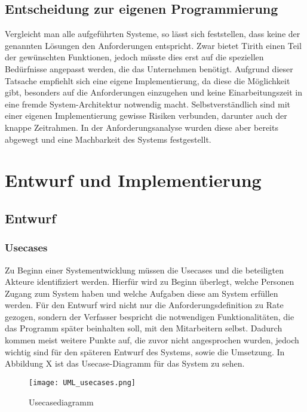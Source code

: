\section{Entscheidung zur eigenen Programmierung}
\label{sec:decisionowncreating}

Vergleicht man alle aufgeführten Systeme, so lässt sich feststellen, dass keine der genannten Lösungen den Anforderungen entspricht.
Zwar bietet Tirith einen Teil der gewünschten Funktionen, jedoch müsste dies erst auf die speziellen Bedürfnisse angepasst werden, die das Unternehmen benötigt.
Aufgrund dieser Tatsache empfiehlt sich eine eigene Implementierung, da diese die Möglichkeit gibt, besonders auf die Anforderungen einzugehen und keine Einarbeitungszeit in eine fremde System-Architektur notwendig macht.
Selbstverständlich sind mit einer eigenen Implementierung gewisse Risiken verbunden, darunter auch der knappe Zeitrahmen.
In der Anforderungsanalyse wurden diese aber bereits abgewegt und eine Machbarkeit des Systems festgestellt.

\chapter{Entwurf und Implementierung}
\label{cha:entw_imp}

\section{Entwurf}
\label{sec:Entwurf}


\subsection{Usecases}
\label{subsec:usecases}

Zu Beginn einer Systementwicklung müssen die Usecases und die beteiligten Akteure identifiziert werden.
Hierfür wird zu Beginn überlegt, welche Personen Zugang zum System haben und welche Aufgaben diese am System erfüllen werden.
Für den Entwurf wird nicht nur die Anforderungsdefinition zu Rate gezogen, sondern der Verfasser bespricht die notwendigen Funktionalitäten, die das Programm später beinhalten soll, mit den Mitarbeitern selbst.
Dadurch kommen meist weitere Punkte auf, die zuvor nicht angesprochen wurden, jedoch wichtig sind für den späteren Entwurf des Systems, sowie die Umsetzung.
In Abbildung X ist das Usecase-Diagramm für das System zu sehen.

\begin{figure}[H]
\centering
\texttt{[image: UML\_usecases.png]}
\caption{Usecasediagramm}
\label{fig:usecase001}
\end{figure}

